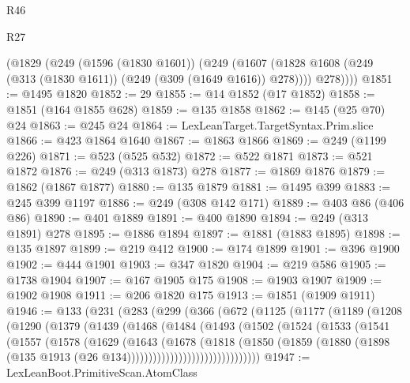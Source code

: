 \begin{lexlean}{R46}
\begin{lexlean}{R27}
\begin{coremodule}
{{{{{{{{{{{{{{{{{{{{{{{{{{{{{{{{{{{{{{{{{{{{{{{{{{{{{{{{{{{{{{      (@1829
        (@249
          (@1596 (@1830 @1601))
          (@249
            (@1607 (@1828 @1608 (@249 (@313 (@1830 @1611)) (@249 (@309 (@1649 @1616)) @278))))
            @278))))
@1851 := @1495 @1820
@1852 := 29
@1855 := @14 @1852 (@17 @1852)
@1858 := @1851 (@164 @1855 @628)
@1859 := @135 @1858
@1862 := @145 (@25 @70) @24
@1863 := @245 @24
@1864 := LexLeanTarget.TargetSyntax.Prim.slice
@1866 := @423 @1864 @1640
@1867 := @1863 @1866
@1869 := @249 (@1199 @226)
@1871 := @523 (@525 @532)
@1872 := @522 @1871
@1873 := @521 @1872
@1876 := @249 (@313 @1873) @278
@1877 := @1869 @1876
@1879 := @1862 (@1867 @1877)
@1880 := @135 @1879
@1881 := @1495 @399
@1883 := @245 @399 @1197
@1886 := @249 (@308 @142 @171)
@1889 := @403 @86 (@406 @86)
@1890 := @401 @1889
@1891 := @400 @1890
@1894 := @249 (@313 @1891) @278
@1895 := @1886 @1894
@1897 := @1881 (@1883 @1895)
@1898 := @135 @1897
@1899 := @219 @412
@1900 := @174 @1899
@1901 := @396 @1900
@1902 := @444 @1901
@1903 := @347 @1820
@1904 := @219 @586
@1905 := @1738 @1904
@1907 := @167 @1905 @175
@1908 := @1903 @1907
@1909 := @1902 @1908
@1911 := @206 @1820 @175
@1913 := @1851 (@1909 @1911)
@1946 := @133
    (@231
      (@283
        (@299
          (@366
            (@672
              (@1125
                (@1177
                  (@1189
                    (@1208
                      (@1290
                        (@1379
                          (@1439
                            (@1468
                              (@1484
                                (@1493
                                  (@1502
                                    (@1524
                                      (@1533
                                        (@1541
                                          (@1557
                                            (@1578
                                              (@1629
                                                (@1643
                                                  (@1678
                                                    (@1818
                                                      (@1850
                                                        (@1859
                                                          (@1880
                                                            (@1898
                                                              (@135
                                                                @1913
                                                                (@26
                                                                  @134)))))))))))))))))))))))))))))))
@1947 := LexLeanBoot.PrimitiveScan.AtomClass
}}}}}}}}}}}}}}}}}}}}}}}}}}}}}}}}}}}}}}}}}}}}}}}}}}}}}}}}}}}}}}
\end{coremodule}
\end{lexlean}
\end{lexlean}
